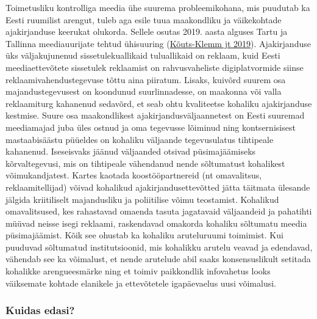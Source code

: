 \documentclass[estonian,]{article}
\begin{document}
Toimetusliku kontrolliga meedia ühe suurema probleemikohana, mis puudutab ka Eesti ruumilist arengut, tuleb aga esile tuua maakondliku ja väikekohtade ajakirjanduse keerukat olukorda. Sellele osutas 2019. aasta alguses Tartu ja Tallinna meediauurijate tehtud ühisuuring (\protect\hyperlink{Kuxf5uts-Klemm2019}{Kõuts-Klemm jt 2019}). Ajakirjanduse üks väljakujunenud sissetulekuallikaid tuluallikaid on reklaam, kuid Eesti meediaettevõtete sissetulek reklaamist on rahvusvaheliste digiplatvormide siinse reklaamivahendustegevuse tõttu aina piiratum. Lisaks, kuivõrd suurem osa majandustegevusest on koondunud suurlinnadesse, on maakonna või valla reklaamiturg kahanenud sedavõrd, et seab ohtu kvaliteetse kohaliku ajakirjanduse kestmise. Suure osa maakondlikest ajakirjandusväljaannetest on Eesti suuremad meediamajad juba üles ostnud ja oma tegevusse lõiminud ning kontsernisisest mastaabisäästu püüeldes on kohaliku väljaande tegevusulatus tihtipeale kahanenud. Iseseisvaks jäänud väljaanded otsivad püsimajäämiseks kõrvaltegevusi, mis on tihtipeale vähendanud nende sõltumatust kohalikest võimukandjatest. Kartes kaotada koostööpartnereid (nt omavalitsus, reklaamitellijad) võivad kohalikud ajakirjandusettevõtted jätta täitmata ülesande jälgida kriitiliselt majandusliku ja poliitilise võimu teostamist. Kohalikud omavalitsused, kes rahastavad omaenda tasuta jagatavaid väljaandeid ja pahatihti müüvad neisse isegi reklaami, raskendavad omakorda kohaliku sõltumatu meedia püsimajäämist. Kõik see ohustab ka kohaliku aruteluruumi toimimist. Kui puuduvad sõltumatud institutsioonid, mis kohalikku arutelu veavad ja edendavad, vähendab see ka võimalust, et nende arutelude abil saaks konsensuslikult setitada kohalikke arengueesmärke ning et toimiv paikkondlik infovahetus looks väiksemate kohtade elanikele ja ettevõtetele igapäevaelus uusi võimalusi.

\hypertarget{kuidas-edasi-2}{%
\subsubsection*{Kuidas edasi?}\label{kuidas-edasi-2}}
\end{document}
